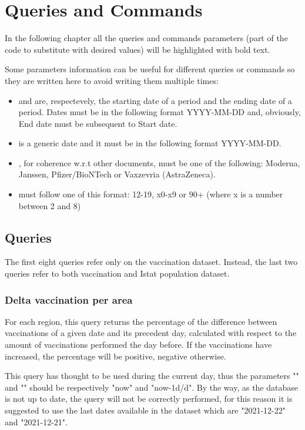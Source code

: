 \documentclass{article}
\begin{document}
\newpage
\section{Queries and Commands}
In the following chapter all the queries and commands parameters (part of the code to substitute with desired values) will be highlighted with {\color{magenta}{magenta}} bold text.

Some parameters information can be useful for different queries or commands so they are written here to avoid writing them multiple times:
\begin{itemize}
    \item {\color{magenta}{Start date}} and {\color{magenta}{End date}} are, respectevely, the starting date of a period and the ending date of a period. Dates must be in the following format YYYY-MM-DD and, obviously, End date must be subsequent to Start date.
    \item {\color{magenta}{Date}} is a generic date and it must be in the following format YYYY-MM-DD.
    \item {\color{magenta}{Supplier}}, for coherence w.r.t other documents, must be one of the following: Moderna, Janssen, Pfizer/BioNTech or Vaxzevria (AstraZeneca).
    \item {\color{magenta}{Age range}} must follow one of this format: 12-19, x0-x9 or 90+ (where x is a number between 2 and 8)
\end{itemize}
\subsection{Queries}
The first eight queries refer only on the vaccination dataset. Instead, the last two queries refer to both vaccination and Istat population dataset.
\subsubsection{Delta vaccination per area}
For each region, this query returns the percentage of the difference between vaccinations of a given date and its precedent day, calculated with respect to the amount of vaccinations performed the day before.
If the vaccinations have increased, the percentage will be positive, negative otherwise.

This query has thought to be used during the current day, thus the parameters "{\color{magenta}{Date 1}}" and "{\color{magenta}{Date 2}}" should be respectively "now" and "now-1d/d". By the way, as the database is not up to date, the query will not be correctly performed, for this reason it is suggested to use the last dates available in the dataset which are "2021-12-22" and "2021-12-21".
\end{document}
